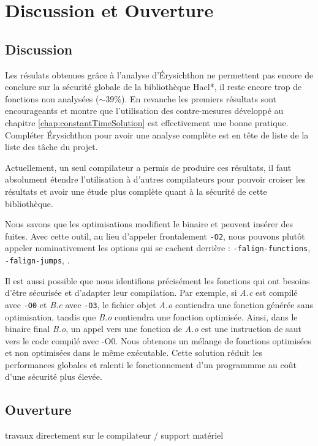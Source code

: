\chapter*{Discussion et Ouverture}

\section*{Discussion}

Les résulats obtenues grâce à l'analyse d'Érysichthon ne permettent pas encore de conclure sur la sécurité globale de la bibliothèque Hacl*, il reste encore trop de fonctions non analysées ($\sim 39\%$). En revanche les premiers résultats sont encourageants et montre que l'utilisation des contre-mesures développé au chapitre \ref{chap:constantTimeSolution} est effectivement une bonne pratique. Compléter Érysichthon pour avoir une analyse complète est en tête de liste de la liste des tâche du projet.\medbreak

Actuellement, un seul compilateur a permis de produire ces résultats, il faut absolument étendre l'utilisation à d'autres compilateurs pour pouvoir croiser les résultats et avoir une étude plus complète quant à la sécurité de cette bibliothèque.\smallbreak

Nous savons que les optimisations modifient le binaire et peuvent insérer des fuites. Avec cette outil, au lieu d'appeler frontalement \texttt{-O2}, nous pouvons plutôt appeler nominativement les options qui se cachent derrière : \texttt{-falign-functions}, \texttt{-falign-jumps}, \etc.\smallbreak

Il est aussi possible que nous identifions précisément les fonctions qui ont besoins d'être sécurisée et d'adapter leur compilation. Par exemple, si \textit{A.c} est compilé avec \texttt{-O0} et \textit{B.c} avec \texttt{-O3}, le fichier objet \textit{A.o} contiendra une fonction générée sans optimisation, tandis que \textit{B.o} contiendra une fonction optimisée. Ainsi, dans le binaire final \textit{B.o}, un appel vers une fonction de \textit{A.o} est une instruction de saut vers le code compilé avec -O0. Nous obtenons un mélange de fonctions optimisées et non optimisées dans le même exécutable. Cette solution réduit les performances globales et ralenti le fonctionnement d'un programmme au coût d'une sécurité plus élevée.\smallbreak

\section*{Ouverture}




travaux directement sur le compilateur / support matériel
